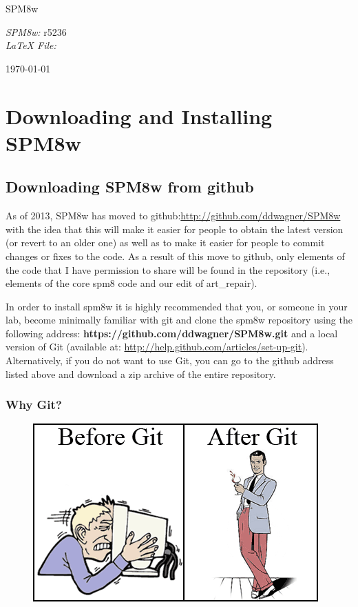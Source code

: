 \documentclass[12pt]{article}
\newcommand{\HRule}{\par\noindent\color{orange}{\rule{\linewidth}{1mm}}}
\begin{document}
\dosecttoc %

\begin{titlepage}
\begin{flushleft}
\vspace*{5cm}
\Huge SPM8w \\[-20pt]
\HRule 
\end{flushleft}
\vfill
\emph{SPM8w:} r5236 \\
\emph{LaTeX File:} \currfilename \vspace{-24pt}
\begin{flushright}
\today
\end{flushright}
\end{titlepage}

\tableofcontents
\newpage

\section{Downloading and Installing SPM8w}
\secttoc  %
\subsection{Downloading SPM8w from github}
As of 2013, SPM8w has moved to github:\url{http://github.com/ddwagner/SPM8w} with the idea that this will make it easier for people to obtain the latest version (or revert to an older one) as well as to make it easier for people to commit changes or fixes to the code. As a result of this move to github, only elements of the code that I have permission to share will be found in the repository (i.e., elements of the core spm8 code and our edit of art\_repair). 

In order to install spm8w it is highly recommended that you, or someone in your lab, become minimally familiar with git and clone the spm8w repository using the following address: \textbf{https://github.com/ddwagner/SPM8w.git} and a local version of Git (available at: \url{http://help.github.com/articles/set-up-git}). Alternatively, if you do not want to use Git, you can go to the github address listed above and download a zip archive of the entire repository. 

\subsubsection{Why Git?}
\begin{figure}[ht]
\centering
\includegraphics[scale=0.5]{./assets/1_git}
\end{figure}
\end{document}

